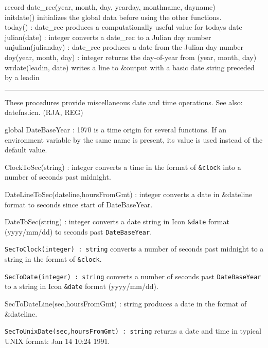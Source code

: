 \textsf{record date\_rec(year, month, day, yearday, monthname,
dayname)}\\
\textsf{initdate()} initializes the global data before using the other
functions.\\
\textsf{today() : date\_rec} produces a computationally useful value for
today{\textquotesingle}s date\\
\textsf{julian}\textsf{(date) : integer} converts a
date\_rec to a Julian day number\\
\textsf{unjulian(julianday) : date\_rec} produces a date from the Julian
day number\\
\textsf{doy(year, month, day) : integer} returns the day-of-year from
(year, month, day)\\
\textsf{wrdate(leadin, date)} writes a line to \textsf{\&output} with a
basic date string preceded by a leadin 

\vspace{0.25cm}\hrule{}

These procedures provide miscellaneous date and time operations. See
also: \textsf{datefns.icn}. (RJA, REG)

\textsf{global DateBaseYear : 1970} is a time origin for several
functions. If an environment
variable by the same name is present, its value is used instead of the
default value.

\textsf{ClockToSec(string) : integer} converts a time in the format of
\texttt{\&clock} into a number of seconds past midnight.

\textsf{DateLineToSec(dateline,hoursFromGmt) : integer} converts a date
in \&dateline format to seconds since start of DateBaseYear.

\textsf{DateToSec(string) : integer} converts a date string in Icon
\texttt{\&date} format (yyyy/mm/dd) to seconds past
\texttt{DateBaseYear}.

\texttt{SecToClock(integer) : string} converts a number of seconds past
midnight to a string in the format of \texttt{\&clock}.

\texttt{SecToDate(integer) : string} converts a number of seconds past
\texttt{DateBaseYear} to a string in Icon \texttt{\&date} format
(yyyy/mm/dd).

\textsf{SecToDateLine(sec,hoursFromGmt) : string} produces a date in the
format of \textsf{\&dateline}.

\texttt{SecToUnixDate(sec,hoursFromGmt) : string} returns a date and
time in typical UNIX format: Jan 14 10:24 1991.

